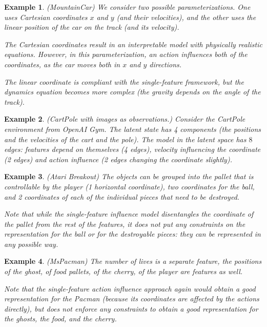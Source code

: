 \documentclass[a4paper,11pt,oneside]{report}
\newtheorem{example}{Example}[section]
\begin{document}
\begin{example}{(MountainCar)}
    We consider two possible parameterizations. One uses Cartesian coordinates $x$ and $y$ (and their velocities), and the other uses the linear position of the car on the track (and its velocity).

    The Cartesian coordinates result in an interpretable model with physically realistic equations. However, in this parameterization, an action influences both of the coordinates, as the car moves both in $x$ and $y$ directions.

    The linear coordinate is compliant with the single-feature framework, but the dynamics equation becomes more complex (the gravity depends on the angle of the track).
\end{example}


\begin{example}{(CartPole with images as observations.)}
    Consider the CartPole environment from OpenAI Gym. The latent state has 4 components (the positions and the velocities of the cart and the pole).
    The model in the latent space has $8$ edges: features depend on themselves (4 edges), velocity influencing the coordinate (2 edges) and action influence (2 edges changing the coordinate slightly).
\end{example}

\begin{example}{(Atari Breakout)}
    The objects can be grouped into the pallet that is controllable by the player (1 horizontal coordinate), two coordinates for the ball, and 2 coordinates of each of the individual pieces that need to be destroyed.

    Note that while the single-feature influence model disentangles the coordinate of the pallet from the rest of the features, it does not put any constraints on the representation for the ball or for the destroyable pieces: they can be represented in any possible way.
\end{example}

\begin{example}{(MsPacman)}
   The number of lives is a separate feature, the positions of the ghost, of food pallets, of the cherry, of the player are features as well.

   Note that the single-feature action influence approach again would obtain a good representation for the Pacman (because its coordinates are affected by the actions directly), but does not enforce any constraints to obtain a good representation for the ghosts, the food, and the cherry.
\end{example}
\end{document}
